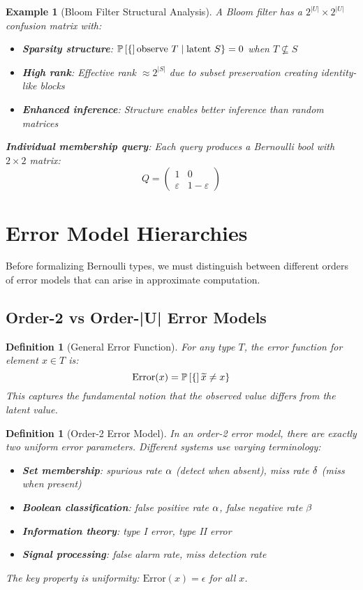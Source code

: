 \documentclass[11pt,final,hidelinks]{article}
\newtheorem{definition}[theorem]{Definition}
\newtheorem{example}[theorem]{Example}
\begin{document}
\begin{example}[Bloom Filter Structural Analysis]
A Bloom filter has a $2^{|U|} \times 2^{|U|}$ confusion matrix with:
\begin{itemize}
    \item \textbf{Sparsity structure}: $\mathbb{P}\left[\{\right]\text{observe } T \mid \text{latent } S\} = 0$ when $T \not\subseteq S$
    \item \textbf{High rank}: Effective rank $\approx 2^{|S|}$ due to subset preservation creating identity-like blocks
    \item \textbf{Enhanced inference}: Structure enables better inference than random matrices
\end{itemize}

\textbf{Individual membership query}: Each query produces a Bernoulli bool with $2 \times 2$ matrix:
$$Q = \begin{pmatrix} 1 & 0 \\ \varepsilon & 1-\varepsilon \end{pmatrix}$$
\end{example}

\section{Error Model Hierarchies}

Before formalizing Bernoulli types, we must distinguish between different orders of error models that can arise in approximate computation.

\subsection{Order-2 vs Order-|U| Error Models}

\begin{definition}[General Error Function]
For any type $T$, the \emph{error function} for element $x \in T$ is:
$$\text{Error}(x) = \mathbb{P}\left[\{\right]\widetilde{x} \neq x\}$$
This captures the fundamental notion that the observed value differs from the latent value.
\end{definition}

\begin{definition}[Order-2 Error Model]
In an \emph{order-2 error model}, there are exactly two uniform error parameters. Different systems use varying terminology:
\begin{itemize}
    \item \textbf{Set membership}: spurious rate $\alpha$ (detect when absent), miss rate $\delta$ (miss when present)
    \item \textbf{Boolean classification}: false positive rate $\alpha$, false negative rate $\beta$ 
    \item \textbf{Information theory}: type I error, type II error
    \item \textbf{Signal processing}: false alarm rate, miss detection rate
\end{itemize}
The key property is uniformity: $\text{Error}(x) = \epsilon$ for all $x$.
\end{definition}
\end{document}
